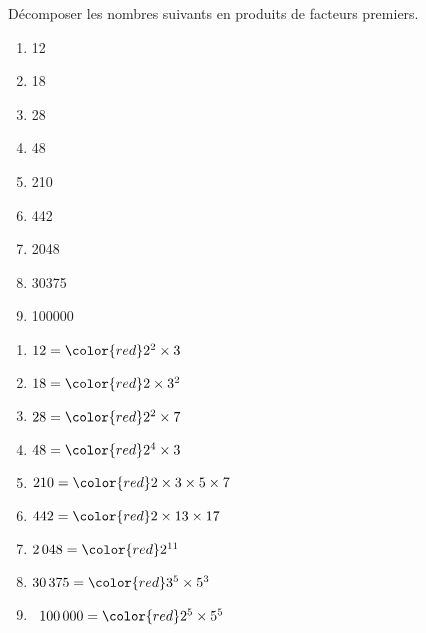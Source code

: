\begin{exercice*}
   Décomposer les nombres suivants en produits de facteurs premiers.
   \begin{multicols}{3}
      \begin{enumerate}
         \item 12 
         \item 18 
         \item 28 
         \item 48
         \item 210
         \item 442
         \item \num{2 048}
         \item \num{30 375}
         \item \num{100 000}
      \end{enumerate}
   \end{multicols}
\end{exercice*}
\begin{corrige}
      \begin{multicols}{2}
         \begin{enumerate}
            \item $12 =\color{red} 2^2\times3$
            \item $18 =\color{red} 2\times3^2$
            \item $28 =\color{red} 2^2\times7$
            \item $48 =\color{red} 2^4\times3$
            \item $210 =\color{red} 2\times3\times5\times7$
            \item $442 =\color{red} 2\times13\times17$
            \item $2\,048 =\color{red} 2^{11}$
            \item $30\,375 =\color{red} 3^5\times5^3$
            \item \, $100\,000 =\color{red} 2^5\times5^5$
         \end{enumerate}
   \end{multicols}
\end{corrige}
